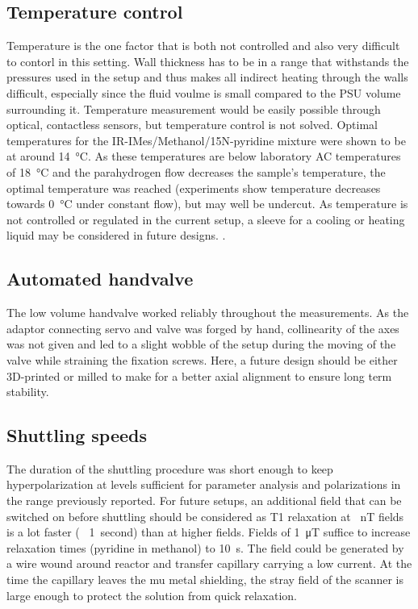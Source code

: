         \subsection{Temperature control}
            \label{cd:sabreShuttling:tempControl}
            Temperature is the one factor that is both not controlled and also very difficult to contorl in this setting. Wall thickness has to be in a range that withstands the pressures used in the setup and thus makes all indirect heating through the walls difficult, especially since the fluid voulme is small compared to the PSU volume surrounding it. Temperature measurement would be easily possible through optical, contactless sensors, but temperature control is not solved. Optimal temperatures for the IR-IMes/Methanol/15N-pyridine mixture were shown to be at around \SI{14}{\celsius}. As these temperatures are below laboratory AC temperatures of \SI{18}{\celsius} and the parahydrogen flow decreases the sample's temperature, the optimal temperature was reached (experiments show temperature decreases towards \SI{0}{\celsius} under constant flow), but may well be undercut. As temperature is not controlled or regulated in the current setup, a sleeve for a cooling or heating liquid may be considered in future designs. .
        \subsection{Automated handvalve}
            The low volume handvalve worked reliably throughout the measurements. As the adaptor connecting servo and valve was forged by hand, collinearity of the axes was not given and led to a slight wobble of the setup during the moving of the valve while straining the fixation screws. Here, a future design should be either 3D-printed or milled to make for a better axial alignment to ensure long term stability. 
        \subsection{Shuttling speeds}
            The duration of the shuttling procedure was short enough to keep hyperpolarization at levels sufficient for parameter analysis and polarizations in the range previously reported. For future setups, an additional field that can be switched on before shuttling should be considered as T1 relaxation at \SI{}{\nano\tesla} fields is a lot faster (~ \SI{1}{second}) than at higher fields. Fields of \SI{1}{\micro\tesla} suffice to increase relaxation times (pyridine in methanol) to  \SI{10}{\second}. The field could be generated by a wire wound around reactor and transfer capillary carrying a low current. At the time the capillary leaves the mu metal shielding, the stray field of the scanner is large enough to protect the solution from quick relaxation.
